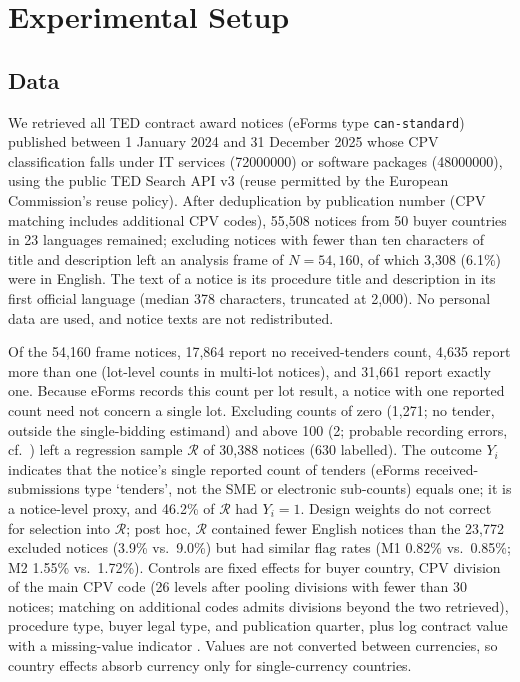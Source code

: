 \documentclass[runningheads]{llncs}
\begin{document}
\section{Experimental Setup}
\subsection{Data}
\label{sec:data}
We retrieved all TED contract award notices (eForms type \texttt{can-standard}) published between 1 January 2024 and 31 December 2025 whose CPV classification falls under IT services (72000000) or software packages (48000000), using the public TED Search API v3 (reuse permitted by the European Commission's reuse policy). After deduplication by publication number (CPV matching includes additional CPV codes), 55,508 notices from 50 buyer countries in 23 languages remained; excluding notices with fewer than ten characters of title and description left an analysis frame of $N=54{,}160$, of which 3,308 (6.1\%) were in English. The text of a notice is its procedure title and description in its first official language (median 378 characters, truncated at 2,000). No personal data are used, and notice texts are not redistributed.

Of the 54,160 frame notices, 17,864 report no received-tenders count, 4,635 report more than one (lot-level counts in multi-lot notices), and 31,661 report exactly one. Because eForms records this count per lot result, a notice with one reported count need not concern a single lot. Excluding counts of zero (1,271; no tender, outside the single-bidding estimand) and above 100 (2; probable recording errors, cf.\ \cite{potin2023}) left a regression sample $\mathcal{R}$ of 30,388 notices (630 labelled). The outcome $Y_i$ indicates that the notice's single reported count of tenders (eForms received-submissions type `tenders', not the SME or electronic sub-counts) equals one; it is a notice-level proxy, and 46.2\% of $\mathcal{R}$ had $Y_i=1$. Design weights do not correct for selection into $\mathcal{R}$; post hoc, $\mathcal{R}$ contained fewer English notices than the 23,772 excluded notices (3.9\% vs.\ 9.0\%) but had similar flag rates (M1 0.82\% vs.\ 0.85\%; M2 1.55\% vs.\ 1.72\%). Controls are fixed effects for buyer country, CPV division of the main CPV code (26 levels after pooling divisions with fewer than 30 notices; matching on additional codes admits divisions beyond the two retrieved), procedure type, buyer legal type, and publication quarter, plus log contract value with a missing-value indicator \cite{fazekas2016,decarolis2022}. Values are not converted between currencies, so country effects absorb currency only for single-currency countries.
\end{document}
